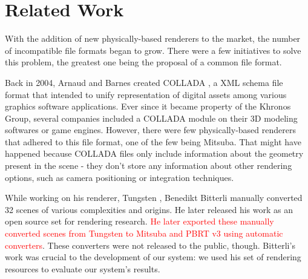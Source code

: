 \section{Related Work}
With the addition of new physically-based renderers to the market, the number of 
incompatible file formats began to grow. There were a few initiatives to solve 
this problem, the greatest one being the proposal of a common file format.

Back in 2004, Arnaud and Barnes created COLLADA \cite{collada}, a XML schema 
file format that intended to unify representation of digital assets among 
various graphics software applications. Ever since it became property of the 
Khronos Group, several companies included a COLLADA module on their 3D modeling 
softwares or game engines. However, there were few physically-based renderers 
that adhered to this file format, one of the few being Mitsuba. That might have 
happened because COLLADA files only include information about the geometry 
present in the scene - they don't store any information about other rendering 
options, such as camera positioning or integration techniques.

While working on his renderer, Tungsten \cite{tungsten}, Benedikt Bitterli 
manually converted 32 scenes of various complexities and origins. He later 
released his work as an open source set for rendering research. \textcolor{red}{He later 
exported these manually converted scenes from Tungsten to Mitsuba and PBRT v3 
using automatic converters}. These converters were not released to the public, 
though. Bitterli's work was crucial to the development of our system: we used 
his set of rendering resources to evaluate our system's results.


